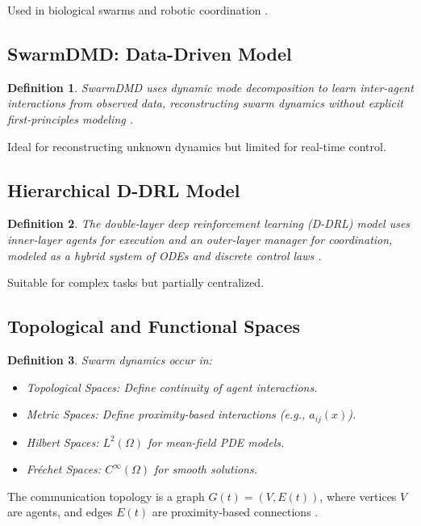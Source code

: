 \documentclass{article}
\theoremstyle{plain}
\newtheorem{definition}{Definition}[section]
\begin{document}
Used in biological swarms and robotic coordination \cite{swarm_dynamics}.

\subsection{SwarmDMD: Data-Driven Model}
\begin{definition}
\emph{SwarmDMD} uses dynamic mode decomposition to learn inter-agent interactions from observed data, reconstructing swarm dynamics without explicit first-principles modeling \cite{swarm_dmd}.
\end{definition}

Ideal for reconstructing unknown dynamics but limited for real-time control.

\subsection{Hierarchical D-DRL Model}
\begin{definition}
The \emph{double-layer deep reinforcement learning (D-DRL)} model uses inner-layer agents for execution and an outer-layer manager for coordination, modeled as a hybrid system of ODEs and discrete control laws \cite{ddrl_swarm}.
\end{definition}

Suitable for complex tasks but partially centralized.

\subsection{Topological and Functional Spaces}

\begin{definition}
Swarm dynamics occur in:
\begin{itemize}
    \item \emph{Topological Spaces}: Define continuity of agent interactions.
    \item \emph{Metric Spaces}: Define proximity-based interactions (e.g., \(a_{ij}(x)\)).
    \item \emph{Hilbert Spaces}: \(L^2(\Omega)\) for mean-field PDE models.
    \item \emph{Fréchet Spaces}: \(C^\infty(\Omega)\) for smooth solutions.
\end{itemize}
\end{definition}

The communication topology is a graph \(G(t) = (V, E(t))\), where vertices \(V\) are agents, and edges \(E(t)\) are proximity-based connections \cite{swarm_dynamics}.
\end{document}
